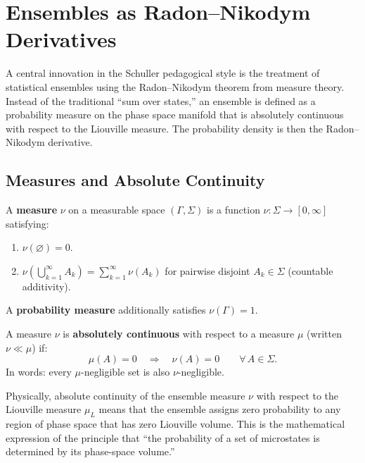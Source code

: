 \chapter{Ensembles as Radon--Nikodym Derivatives}

A central innovation in the Schuller pedagogical style is the treatment of statistical ensembles using the Radon--Nikodym theorem from measure theory. Instead of the traditional ``sum over states,'' an ensemble is defined as a probability measure on the phase space manifold that is absolutely continuous with respect to the Liouville measure. The probability density is then the Radon--Nikodym derivative.

\section{Measures and Absolute Continuity}

\begin{definition}[Measure]
A \textbf{measure} $\nu$ on a measurable space $(\Gamma, \Sigma)$ is a function $\nu: \Sigma \to [0, \infty]$ satisfying:
\begin{enumerate}
\item $\nu(\varnothing) = 0$.
\item $\nu\!\left(\bigcup_{k=1}^\infty A_k\right) = \sum_{k=1}^\infty \nu(A_k)$ for pairwise disjoint $A_k \in \Sigma$ (countable additivity).
\end{enumerate}
A \textbf{probability measure} additionally satisfies $\nu(\Gamma) = 1$.
\end{definition}

\begin{definition}
A measure $\nu$ is \textbf{absolutely continuous} with respect to a measure $\mu$ (written $\nu \ll \mu$) if:
\begin{equation}
\mu(A) = 0 \quad \Longrightarrow \quad \nu(A) = 0 \qquad \forall\, A \in \Sigma.
\end{equation}
In words: every $\mu$-negligible set is also $\nu$-negligible.
\end{definition}

Physically, absolute continuity of the ensemble measure $\nu$ with respect to the Liouville measure $\mu_L$ means that the ensemble assigns zero probability to any region of phase space that has zero Liouville volume. This is the mathematical expression of the principle that ``the probability of a set of microstates is determined by its phase-space volume.''

